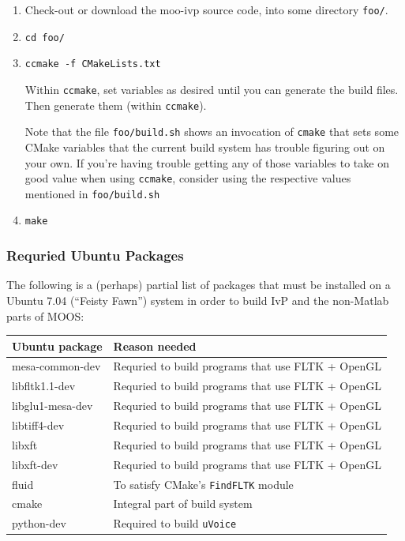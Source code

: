 \documentclass[letterpaper,10pt]{article}
\begin{document}
\begin{enumerate}
 \item Check-out or download the moo-ivp source code, into some directory \verb|foo/|.
 \item \verb|cd foo/|
 \item \verb|ccmake -f CMakeLists.txt|

	Within \verb|ccmake|, set variables as desired until you can generate the
	build files.  Then generate them (within \verb|ccmake|).

	Note that the file \verb|foo/build.sh| shows an invocation of \verb|cmake| that
	sets some CMake variables that the current build system has trouble figuring
	out on your own.  If you're having trouble getting any of those variables to
	take on good value when using \verb|ccmake|, consider using the respective
	values mentioned in \verb|foo/build.sh|

\item \verb|make|

\end{enumerate}


\subsubsection{Requried Ubuntu Packages}
The following is a (perhaps) partial list of packages that must be installed on a 
Ubuntu 7.04 (``Feisty Fawn'') system in order to build IvP and the non-Matlab parts
of MOOS:
\begin{center}
\begin{tabular}{|l|l|}
\hline
Ubuntu package & Reason needed \\
\hline
\hline
mesa-common-dev & Requried to build programs that use FLTK + OpenGL \\
\hline
libfltk1.1-dev & Requried to build programs that use FLTK + OpenGL \\
\hline
libglu1-mesa-dev & Requried to build programs that use FLTK + OpenGL \\
\hline
libtiff4-dev & Requried to build programs that use FLTK + OpenGL \\
\hline
libxft & Requried to build programs that use FLTK + OpenGL \\
\hline
libxft-dev & Requried to build programs that use FLTK + OpenGL \\
\hline
fluid & To satisfy CMake's \verb|FindFLTK| module \\
\hline
cmake & Integral part of build system \\
\hline
python-dev & Required to build \verb|uVoice|\\
\hline
\end{tabular}
\end{center}
\end{document}
